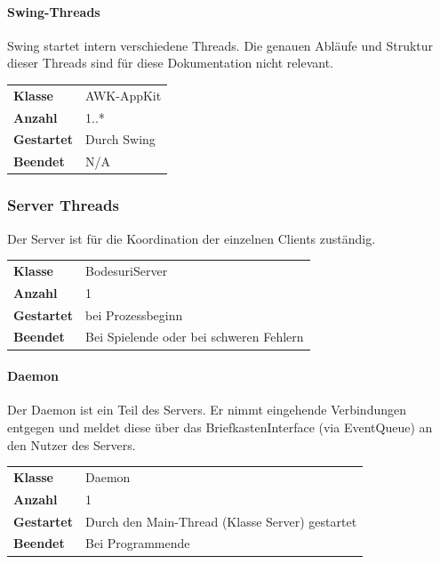 \documentclass[12pt,halfparskip]{scrartcl}
\begin{document}
\paragraph{Swing-Threads}
\label{ssub:swing_threads}

Swing startet intern verschiedene Threads. Die genauen Abläufe und Struktur dieser Threads sind für diese Dokumentation nicht relevant.

\begin{tabular}{@{} l p{12.5cm}}
\textbf{Klasse}       & AWK-AppKit \\
\textbf{Anzahl}       & 1..* \\
\textbf{Gestartet}    & Durch Swing \\
\textbf{Beendet}      & N/A

\end{tabular}

\clearpage
\subsubsection{Server Threads}
\label{ssub:server}

Der Server ist für die Koordination der einzelnen Clients zuständig.

\begin{tabular}{@{} l p{12.5cm}}
\textbf{Klasse}       & BodesuriServer \\
\textbf{Anzahl}       & 1 \\
\textbf{Gestartet}    & bei Prozessbeginn \\
\textbf{Beendet}      & Bei Spielende oder bei schweren Fehlern
\end{tabular}

\paragraph{Daemon}
\label{ssub:daemon}

Der Daemon ist ein Teil des Servers. Er nimmt eingehende Verbindungen entgegen und meldet diese über das BriefkastenInterface (via EventQueue) an den Nutzer des Servers.

\begin{tabular}{@{} l p{12.5cm}}
\textbf{Klasse}       & Daemon \\
\textbf{Anzahl}       & 1 \\
\textbf{Gestartet}    & Durch den Main-Thread (Klasse Server) gestartet \\
\textbf{Beendet}      & Bei Programmende
\end{tabular}
\end{document}
